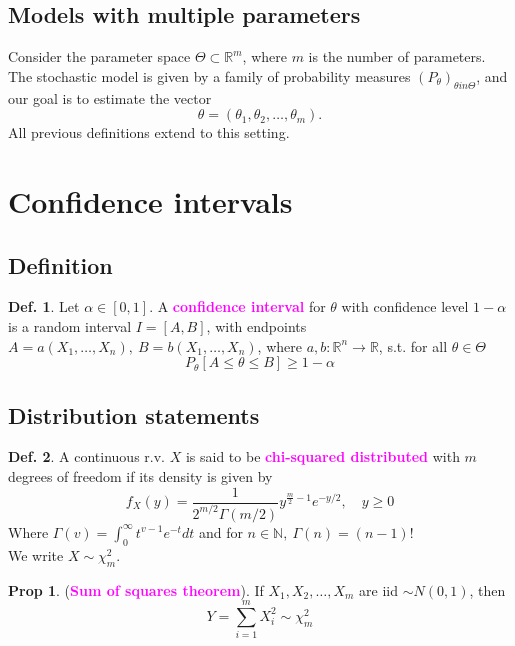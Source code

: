 \documentclass[8pt,a4paper,landscape]{article}
\theoremstyle{definition}
\newtheorem{definition}{Def.}[section]
\theoremstyle{example}
\theoremstyle{intuition}
\theoremstyle{definition}
\newtheorem{proposition}{Prop}[section]
\newcommand{\mydef}[1]{\textcolor{magenta}{\textbf{#1}}}
\begin{document}
\begin{multicols}{3}
			\subsection{Models with multiple parameters}
				Consider the parameter space $\Theta \subset \mathbb{R}^m$, where $m$ is the number of parameters. The stochastic model is given by a family of probability measures $(P_\theta)_{\theta in \Theta}$, and our goal is to estimate the vector 
				$$
					\theta = (\theta_1, \theta_2, \ldots, \theta_m).
				$$
				All previous definitions extend to this setting.


		\section{Confidence intervals}
			

			\subsection{Definition}
				\begin{definition}
					Let $\alpha \in [0,1]$. A \mydef{confidence interval} for $\theta$ with confidence level $1-\alpha$ is a random interval $I = [A,B]$, with endpoints $A = a(X_1, \ldots, X_n), \ B = b(X_1, \ldots, X_n)$, where $a,b : \mathbb{R}^n \to \mathbb{R}$, s.t. for all $\theta \in \Theta$ 
					$$
						P_\theta[A \leq \theta \leq B] \geq 1 - \alpha
					$$
				\end{definition}


			\subsection{Distribution statements}
				\begin{definition}
					A continuous r.v. $X$ is said to be \mydef{chi-squared distributed} with $m$ degrees of freedom if its density is given by 
					$$
					f_X(y) = \frac{1}{2^{m/2} \Gamma(m/2)} y^{\frac{m}{2} - 1} e^{-y/2}, \quad y \geq 0
					$$
					Where $\Gamma(v) = \int^\infty_0 t^{v-1}e^{-t}dt$ and for $n \in \mathbb{N}, \ \Gamma(n) = (n-1)!$\\
					We write $X \sim \chi^2_m$.
				\end{definition}

				\begin{proposition}
					(\mydef{Sum of squares theorem}). If $X_1, X_2, \ldots, X_m$ are iid $\sim N(0,1)$, then 
					$$
						Y = \sum^m_{i = 1} X^2_i \sim \chi^2_m
					$$
				\end{proposition}


\end{multicols}
\end{document}
